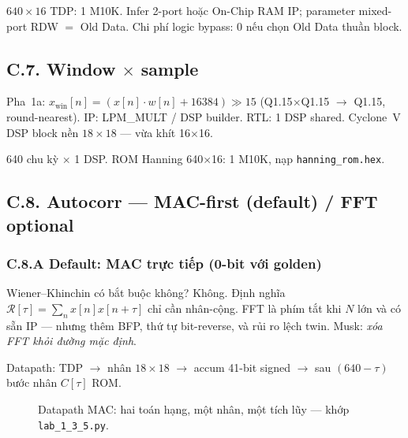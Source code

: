 \begin{costbox}
$640\times 16$ TDP: 1 M10K. Infer 2-port hoặc On-Chip RAM IP; parameter mixed-port RDW $=$ Old Data. Chi phí logic bypass: 0 nếu chọn Old Data thuần block.
\end{costbox}

\subsection*{C.7. Window $\times$ sample}

Pha~1a: $x_{\text{win}}[n] = (x[n]\cdot w[n] + 16384) \gg 15$ (Q1.15$\times$Q1.15 $\to$ Q1.15, round-nearest). IP: LPM\_MULT / DSP builder. RTL: 1 DSP shared. Cyclone~V DSP block nền $18\times 18$ --- vừa khít 16$\times$16.

\begin{costbox}
640 chu kỳ $\times$ 1 DSP. ROM Hanning 640$\times$16: 1 M10K, nạp \texttt{hanning\_rom.hex}.
\end{costbox}

\subsection*{C.8. Autocorr --- MAC-first (default) / FFT optional}

\subsubsection*{C.8.A Default: MAC trực tiếp (0-bit với golden)}

\begin{firstprin}{Wiener--Khinchin có bắt buộc không?}
Không. Định nghĩa $\mathcal{R}[\tau]=\sum_n x[n]x[n+\tau]$ chỉ cần nhân-cộng. FFT là phím tắt khi $N$ lớn và có sẵn IP --- nhưng thêm BFP, thứ tự bit-reverse, và rủi ro lệch twin. Musk: \emph{xóa FFT khỏi đường mặc định}.
\end{firstprin}

\noindent Datapath: TDP $\to$ nhân $18\times 18$ $\to$ accum 41-bit signed $\to$ sau $(640-\tau)$ bước nhân $C[\tau]$ ROM.

\begin{figure}[H]
\centering
{}
\caption{Datapath MAC: hai toán hạng, một nhân, một tích lũy --- khớp \texttt{lab\_1\_3\_5.py}.}
\label{fig:mac_datapath}
\end{figure}


